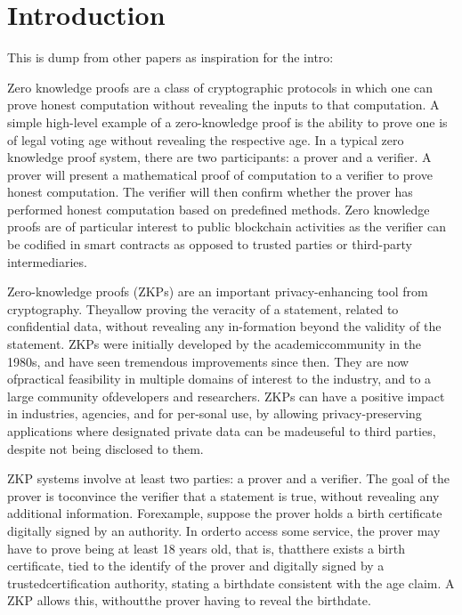 \chapter{Introduction}

This is dump from other papers as inspiration for the intro:


Zero knowledge proofs are a class of cryptographic protocols in which one can prove
honest computation without revealing the inputs to that computation. A simple high-level
example of a zero-knowledge proof is the ability to prove one is of legal voting age
without revealing the respective age. In a typical zero knowledge proof system, there
are two participants: a prover and a verifier. A prover will present a mathematical proof
of computation to a verifier to prove honest computation. The verifier will then confirm
whether the prover has performed honest computation based on predefined methods.
Zero knowledge proofs are of particular interest to public blockchain activities as the
verifier can be codified in smart contracts as opposed to trusted parties or third-party
intermediaries.


Zero-knowledge proofs (ZKPs) are an important privacy-enhancing tool from cryptography. Theyallow proving the veracity of a statement, related to confidential data, without revealing any in-formation beyond the validity of the statement. ZKPs were initially developed by the academiccommunity in the 1980s, and have seen tremendous improvements since then. They are now ofpractical feasibility in multiple domains of interest to the industry, and to a large community ofdevelopers and researchers. ZKPs can have a positive impact in industries, agencies, and for per-sonal use, by allowing privacy-preserving applications where designated private data can be madeuseful to third parties, despite not being disclosed to them. 

ZKP systems involve at least two parties: a prover and a verifier. The goal of the prover is toconvince the verifier that a statement is true, without revealing any additional information. Forexample, suppose the prover holds a birth certificate digitally signed by an authority. In orderto access some service, the prover may have to prove being at least 18 years old, that is, thatthere exists a birth certificate, tied to the identify of the prover and digitally signed by a trustedcertification authority, stating a birthdate consistent with the age claim. A ZKP allows this, withoutthe prover having to reveal the birthdate.


